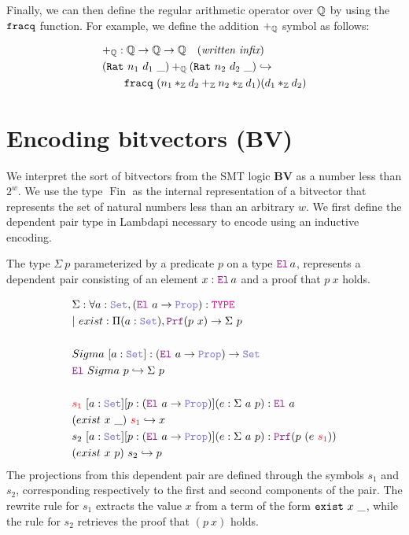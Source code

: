 Finally, we can then define the regular arithmetic operator over $\mathbb{Q}$ by using the $\texttt{\upshape{fracq}}$ function.
For example, we define the addition $+_{\mathbb{Q}}$ symbol as follows:

\begin{align*}
&+_{\mathbb{Q}} : \mathbb{Q} \rightarrow \mathbb{Q} \rightarrow \mathbb{Q} \quad (\textit{written infix})\\ 
&(\texttt{\upshape{Rat}}~n_1~d_1~\_) +_{\mathbb{Q}} (\texttt{\upshape{Rat}}~n_2~d_2~\_) \hookrightarrow\\
&\qquad \texttt{\upshape{fracq}}~(n_1 *_{\mathbb{Z}} d_2 +_{\mathbb{Z}} n_2 *_{\mathbb{Z}} d_1) (d_1 *_{\mathbb{Z}} d_2) \\
\end{align*}


\section{Encoding bitvectors (\textbf{\uppercase{BV}})}
\label{ssec:encoding-bv}

We interpret the sort of bitvectors  from the SMT logic \textbf{BV} as a number less than $2^w$. We use the type $\mathop{Fin}$ as the internal representation of a bitvector
that represents the set of natural numbers less than an arbitrary $w$. We first define the dependent pair type in Lambdapi necessary to encode  using an inductive encoding.

\begin{definition}\label{dep-pair-def}
The type $\Sigma~p$ parameterized by a predicate $p$ on a type $\el\,a$, represents a dependent pair consisting of an element $x : \el\,a$ and a proof that $p~x$ holds.

\begin{align*}
&\Sigma : \forall a : \set{}, (\el{}~a \ra \prop): \type \\
&|~exist : \Pi (a : \set{}), \prf (p~x) \ra \Sigma~p \\
&\\
& Sigma~[a: \set{}]: (\el{}~a \ra \prop) \ra \set{} \\
& \el{}~Sigma~p \re \Sigma~p \\
&\\
& \textcolor{red}{s_1}~[a: \set{}] [p:(\el{}~a \ra \prop)] (e: \Sigma~a~p): \el{}~a \\
& (exist~x~\_)~\textcolor{red}{s_1} \re x\\
& s_2~[a: \set{}] [p:(\el{}~a \ra \prop)] (e: \Sigma~a~p): \prf{}(p~(e~\textcolor{red}{s_1})) \\
& (exist~x~p)~s_2 \re p\\
\end{align*}
The projections from this dependent pair are defined through the symbols $s_1$ and $s_2$, corresponding respectively to the first and second components of the pair.
The rewrite rule for $s_1$ extracts the value $x$ from a term of the form $\texttt{\upshape{exist}}~x~\_$, while the rule for $s_2$ retrieves the proof that $(p~x)$ holds.
\end{definition}


